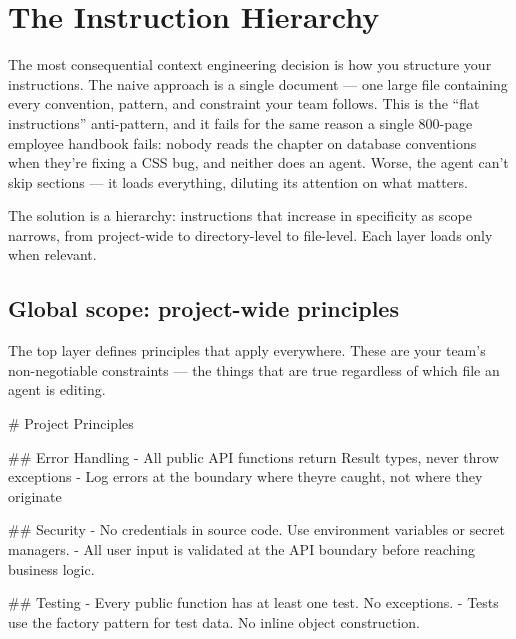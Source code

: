 \documentclass[
  a4paper,
  DIV=11,
  numbers=noendperiod]{scrreprt}
\newenvironment{Shaded}{\begin{snugshade}}{\end{snugshade}}
\newcommand{\FunctionTok}[1]{\textcolor[rgb]{0.28,0.35,0.67}{#1}}
\newcommand{\NormalTok}[1]{\textcolor[rgb]{0.00,0.23,0.31}{#1}}
\newcommand{\SpecialStringTok}[1]{\textcolor[rgb]{0.13,0.47,0.30}{#1}}
\begin{document}
\section{The Instruction Hierarchy}\label{the-instruction-hierarchy-1}

The most consequential context engineering decision is how you structure
your instructions. The naive approach is a single document --- one large
file containing every convention, pattern, and constraint your team
follows. This is the ``flat instructions'' anti-pattern, and it fails
for the same reason a single 800-page employee handbook fails: nobody
reads the chapter on database conventions when they're fixing a CSS bug,
and neither does an agent. Worse, the agent can't skip sections --- it
loads everything, diluting its attention on what matters.

The solution is a hierarchy: instructions that increase in specificity
as scope narrows, from project-wide to directory-level to file-level.
Each layer loads only when relevant.

\subsection{Global scope: project-wide
principles}\label{global-scope-project-wide-principles}

The top layer defines principles that apply everywhere. These are your
team's non-negotiable constraints --- the things that are true
regardless of which file an agent is editing.

\begin{Shaded}
\begin{Highlighting}[]
\FunctionTok{\# Project Principles}

\FunctionTok{\#\# Error Handling}
\SpecialStringTok{{-} }\NormalTok{All public API functions return Result types, never throw exceptions}
\SpecialStringTok{{-} }\NormalTok{Log errors at the boundary where they\textquotesingle{}re caught, not where they originate}

\FunctionTok{\#\# Security}
\SpecialStringTok{{-} }\NormalTok{No credentials in source code. Use environment variables or secret managers.}
\SpecialStringTok{{-} }\NormalTok{All user input is validated at the API boundary before reaching business logic.}

\FunctionTok{\#\# Testing}
\SpecialStringTok{{-} }\NormalTok{Every public function has at least one test. No exceptions.}
\SpecialStringTok{{-} }\NormalTok{Tests use the factory pattern for test data. No inline object construction.}
\end{Highlighting}
\end{Shaded}
\end{document}
